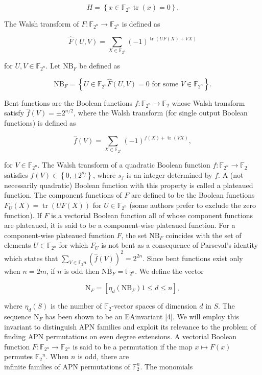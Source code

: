 \documentclass[10pt]{article}
\begin{document}
$$
H=\left\{x \in \mathbb{F}_{2^{n}} \operatorname{tr}(x)=0\right\} .
$$

The Walsh transform of $F: \mathbb{F}_{2^{n}} \rightarrow \mathbb{F}_{2^{n}}$ is defined as

$$
\widehat{F}(U, V)=\sum_{X \in \mathbb{F}_{2^{n}}}(-1)^{\operatorname{tr}(U F(X)+V X)}
$$

for $U, V \in \mathbb{F}_{2^{n}}$. Let $\mathrm{NB}_{F}$ be defined as

$$
\mathrm{NB}_{F}=\left\{U \in \mathbb{F}_{2^{n}} \widehat{F}(U, V)=0 \text { for some } V \in \mathbb{F}_{2^{n}}\right\} .
$$

Bent functions are the Boolean functions $f: \mathbb{F}_{2^{n}} \rightarrow \mathbb{F}_{2}$ whose Walsh transform satisfy $\widehat{f}(V)= \pm 2^{n / 2}$, where the Walsh transform (for single output Boolean functions) is defined as

$$
\widehat{f}(V)=\sum_{X \in \mathbb{F}_{2^{n}}}(-1)^{f(X)+\operatorname{tr}(V X)},
$$

for $V \in \mathbb{F}_{2^{n}}$. The Walsh transform of a quadratic Boolean function $f: \mathbb{F}_{2^{n}} \rightarrow \mathbb{F}_{2}$ satisfies $\widehat{f}(V) \in\left\{0, \pm 2^{s_{f}}\right\}$, where $s_{f}$ is an integer determined by $f$. A (not necessarily quadratic) Boolean function with this property is called a plateaued function. The component functions of $F$ are defined to be the Boolean functions $F_{U}(X)=\operatorname{tr}(U F(X))$ for $U \in \mathbb{F}_{2^{n}}$ (some authors prefer to exclude the zero function). If $F$ is a vectorial Boolean function all of whose component functions are plateaued, it is said to be a component-wise plateaued function. For a component-wise plateaued function $F$, the set $\mathrm{NB}_{F}$ coincides with the set of elements $U \in \mathbb{F}_{2^{n}}$ for which $F_{U}$ is not bent as a consequence of Parseval's identity which states that $\sum_{V \in \mathbb{F}_{2} n}(\widehat{f}(V))^{2}=2^{2 n}$. Since bent functions exist only when $n=2 m$, if $n$ is odd then $\mathrm{NB}_{F}=\mathbb{F}_{2^{n}}$. We define the vector

$$
\mathrm{N}_{F}=\left[\eta_{d}\left(\mathrm{NB}_{F}\right) 1 \leq d \leq n\right],
$$

where $\eta_{d}(S)$ is the number of $\mathbb{F}_{2}$-vector spaces of dimension $d$ in $S$. The sequence $\mathrm{N}_{F}$ has been shown to be an EAinvariant [4]. We will employ this invariant to distinguish APN families and exploit its relevance to the problem of finding APN permutations on even degree extensions. A vectorial Boolean function $F: \mathbb{F}_{2^{n}} \rightarrow \mathbb{F}_{2^{n}}$ is said to be a permutation if the map $x \mapsto F(x)$ permutes $\mathbb{F}_{2}{ }^{n}$. When $n$ is odd, there are\\
infinite families of APN permutations of $\mathbb{F}_{2}^{n}$. The monomials
\end{document}
